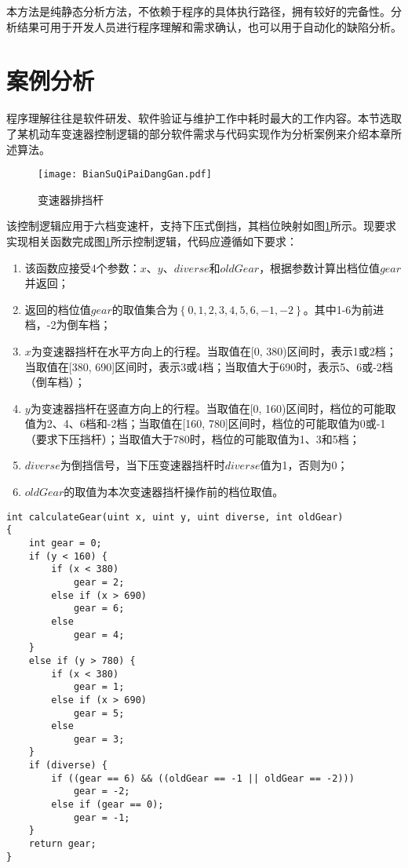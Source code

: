 本方法是纯静态分析方法，不依赖于程序的具体执行路径，拥有较好的完备性。分析结果可用于开发人员进行程序理解和需求确认，也可以用于自动化的缺陷分析。

\section{案例分析}
\label{sec:值流图案例分析}

程序理解往往是软件研发、软件验证与维护工作中耗时最大的工作内容。本节选取了某机动车变速器控制逻辑的部分软件需求与代码实现作为分析案例来介绍本章所述算法。

\begin{figure}[H]
	\centering
	\texttt{[image: BianSuQiPaiDangGan.pdf]}
	\caption{变速器排挡杆}
	\label{fig:gearLever}
\end{figure}

该控制逻辑应用于六档变速杆，支持下压式倒挡，其档位映射如图\ref{fig:gearLever}所示。现要求实现相关函数完成图\ref{fig:gearLever}所示控制逻辑，代码应遵循如下要求：

\begin{enumerate}
	\item 该函数应接受4个参数：$ x $、$ y $、$ diverse $和$ oldGear $，根据参数计算出档位值$ gear $并返回；
	\item 返回的档位值$ gear $的取值集合为$\left\{0, 1, 2, 3, 4, 5, 6, -1, -2\right\}$。其中1-6为前进档，-2为倒车档；
	\item $ x $为变速器挡杆在水平方向上的行程。当取值在[0, 380)区间时，表示1或2档；当取值在[380, 690]区间时，表示3或4档；当取值大于690时，表示5、6或-2档（倒车档）；
	\item  $ y $为变速器挡杆在竖直方向上的行程。当取值在[0, 160)区间时，档位的可能取值为2、4、6档和-2档；当取值在[160, 780]区间时，档位的可能取值为0或-1（要求下压挡杆）；当取值大于780时，档位的可能取值为1、3和5档；
	\item $ diverse $为倒挡信号，当下压变速器挡杆时$ diverse $值为1，否则为0；
	\item $ oldGear $的取值为本次变速器挡杆操作前的档位取值。
\end{enumerate}

\begin{lstlisting}[label=code:gearLever,caption=变速器档位控制的一个函数实现]
int calculateGear(uint x, uint y, uint diverse, int oldGear)
{
	int gear = 0;
	if (y < 160) {
		if (x < 380)
			gear = 2;
		else if (x > 690)
			gear = 6;
		else
			gear = 4;
	}
	else if (y > 780) {
		if (x < 380)
			gear = 1;
		else if (x > 690)
			gear = 5;
		else
			gear = 3;
	}
	if (diverse) {
		if ((gear == 6) && ((oldGear == -1 || oldGear == -2)))
			gear = -2;
		else if (gear == 0);
			gear = -1;
	}
	return gear;
}
\end{lstlisting}

